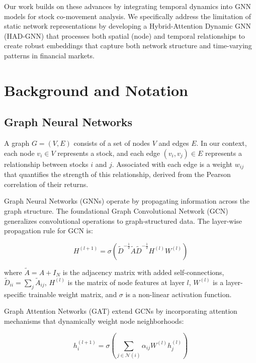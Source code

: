 \documentclass[12pt]{article}
\begin{document}
Our work builds on these advances by integrating temporal dynamics into GNN models for stock co-movement analysis. We specifically address the limitation of static network representations by developing a Hybrid-Attention Dynamic GNN (HAD-GNN) that processes both spatial (node) and temporal relationships to create robust embeddings that capture both network structure and time-varying patterns in financial markets.

\section{Background and Notation}

\subsection{Graph Neural Networks}

A graph $G = (V, E)$ consists of a set of nodes $V$ and edges $E$. In our context, each node $v_i \in V$ represents a stock, and each edge $(v_i, v_j) \in E$ represents a relationship between stocks $i$ and $j$. Associated with each edge is a weight $w_{ij}$ that quantifies the strength of this relationship, derived from the Pearson correlation of their returns.

Graph Neural Networks (GNNs) operate by propagating information across the graph structure. The foundational Graph Convolutional Network (GCN) \cite{kipf2017} generalizes convolutional operations to graph-structured data. The layer-wise propagation rule for GCN is:

\begin{equation}
H^{(l+1)} = \sigma(\tilde{D}^{-\frac{1}{2}}\tilde{A}\tilde{D}^{-\frac{1}{2}}H^{(l)}W^{(l)})
\end{equation}

where $\tilde{A} = A + I_N$ is the adjacency matrix with added self-connections, $\tilde{D}_{ii} = \sum_j \tilde{A}_{ij}$, $H^{(l)}$ is the matrix of node features at layer $l$, $W^{(l)}$ is a layer-specific trainable weight matrix, and $\sigma$ is a non-linear activation function.

Graph Attention Networks (GAT) \cite{velivckovic2018} extend GCNs by incorporating attention mechanisms that dynamically weight node neighborhoods:

\begin{equation}
h_i^{(l+1)} = \sigma\left(\sum_{j \in \mathcal{N}(i)} \alpha_{ij}W^{(l)}h_j^{(l)}\right)
\end{equation}
\end{document}
